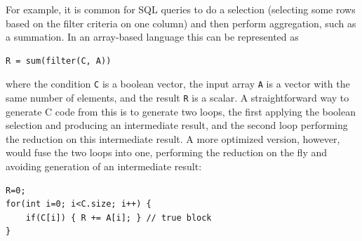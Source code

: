 For example, it is common for SQL queries to do a selection (selecting some
rows based on the filter criteria on one column) and then perform aggregation,
such as a summation.  In an array-based language this can be represented as

\begin{small}
\begin{Verbatim}[xleftmargin=.3\columnwidth]
R = sum(filter(C, A))
\end{Verbatim}
\end{small}


\noindent{}where the condition \texttt{C} is a boolean vector, the input array \texttt{A}
is a vector with the same number of elements, and the result \texttt{R} is a
scalar.  A straightforward way to generate C code from this is to generate two loops, the first applying the boolean selection and producing an intermediate result, and the second loop performing the reduction on this intermediate result.  A more optimized version, however, would fuse the two loops into one, performing the reduction on the fly and avoiding generation of an intermediate result:


\begin{small}
\begin{Verbatim}[xleftmargin=.15\columnwidth]
R=0;
for(int i=0; i<C.size; i++) {
    if(C[i]) { R += A[i]; } // true block
}
\end{Verbatim}
\end{small}


